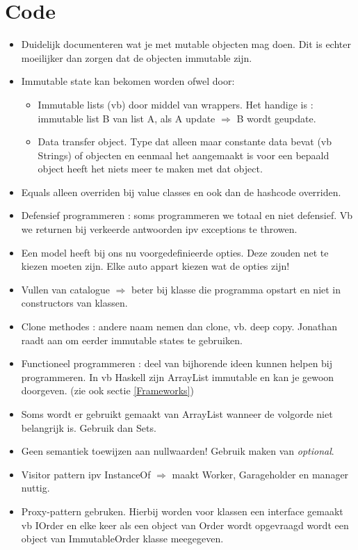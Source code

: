 \documentclass[DIV=calc,11pt ]{scrartcl}
\begin{document}
\section{Code}
\begin{itemize}
\item Duidelijk documenteren wat je met mutable objecten mag doen. Dit is echter moeilijker dan zorgen dat de objecten immutable zijn.
\item Immutable state kan bekomen worden ofwel door:
\begin{itemize}
\item Immutable lists (vb) door middel van wrappers. Het handige is : immutable list B van list A, als A update $\Rightarrow$ B wordt geupdate.
\item Data transfer object. Type dat alleen maar constante data bevat (vb Strings) of objecten en eenmaal het aangemaakt is voor een bepaald object heeft het niets meer te maken met dat object.
\end{itemize}
\item Equals alleen overriden bij value classes en ook dan de hashcode overriden.
\item Defensief programmeren : soms programmeren we totaal en niet defensief. Vb we returnen bij verkeerde antwoorden ipv exceptions te throwen.
\item Een model heeft bij ons nu voorgedefinieerde opties. Deze zouden net te kiezen moeten zijn. Elke auto appart kiezen wat de opties zijn!
\item Vullen van catalogue $\Rightarrow$ beter bij klasse die programma opstart en niet in constructors van klassen.
\item Clone methodes : andere naam nemen dan clone, vb. deep copy. Jonathan raadt aan om eerder immutable states te gebruiken.
\item Functioneel programmeren : deel van bijhorende ideen kunnen helpen bij programmeren. In vb Haskell zijn ArrayList immutable en kan je gewoon doorgeven. (zie ook sectie \ref{Frameworks})
\item Soms wordt er gebruikt gemaakt van ArrayList wanneer de volgorde niet belangrijk is. Gebruik dan Sets.
\item Geen semantiek toewijzen aan nullwaarden! Gebruik maken van \textit{optional}. 
\item Visitor pattern ipv InstanceOf $\Rightarrow$ maakt Worker, Garageholder en manager nuttig.
\item Proxy-pattern gebruken. Hierbij worden voor klassen een interface gemaakt vb IOrder en elke keer als een object van Order wordt opgevraagd wordt een object van ImmutableOrder klasse meegegeven.
\end{itemize}
\end{document}
